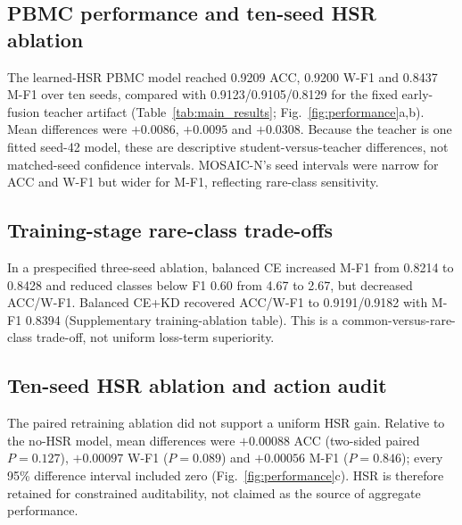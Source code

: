 \documentclass[unnumsec,webpdf,contemporary,large,numbered]{oup-authoring-template}
\begin{document}
\begin{table}[t]
\centering
\caption{Attributable closed-set performance with 95\% interval margins. Methods are columns and dataset--metric pairs are rows. Bold indicates the highest point estimate in the audited matrix, not a significant difference. PBMC uses the learned-HSR single-model mean; COVID-19 uses the MOSAIC-N base-model mean; GSE164378 5P uses a fixed MOSAIC-N majority ensemble.}
\label{tab:main_results}
\tiny
\setlength{\tabcolsep}{0.9pt}
\resizebox{\textwidth}{!}{%

}
\end{table}

\subsection{PBMC performance and ten-seed HSR ablation}

The learned-HSR PBMC model reached 0.9209 ACC, 0.9200 W-F1 and 0.8437 M-F1 over ten seeds, compared with 0.9123/0.9105/0.8129 for the fixed early-fusion teacher artifact (Table~\ref{tab:main_results}; Fig.~\ref{fig:performance}a,b). Mean differences were $+0.0086$, $+0.0095$ and $+0.0308$. Because the teacher is one fitted seed-42 model, these are descriptive student-versus-teacher differences, not matched-seed confidence intervals. MOSAIC-N's seed intervals were narrow for ACC and W-F1 but wider for M-F1, reflecting rare-class sensitivity.

\subsection{Training-stage rare-class trade-offs}

In a prespecified three-seed ablation, balanced CE increased M-F1 from 0.8214 to 0.8428 and reduced classes below F1 0.60 from 4.67 to 2.67, but decreased ACC/W-F1. Balanced CE+KD recovered ACC/W-F1 to 0.9191/0.9182 with M-F1 0.8394 (Supplementary training-ablation table). This is a common-versus-rare-class trade-off, not uniform loss-term superiority.

\subsection{Ten-seed HSR ablation and action audit}

The paired retraining ablation did not support a uniform HSR gain. Relative to the no-HSR model, mean differences were $+0.00088$ ACC (two-sided paired $P=0.127$), $+0.00097$ W-F1 ($P=0.089$) and $+0.00056$ M-F1 ($P=0.846$); every 95\% difference interval included zero (Fig.~\ref{fig:performance}c). HSR is therefore retained for constrained auditability, not claimed as the source of aggregate performance.
\end{document}
